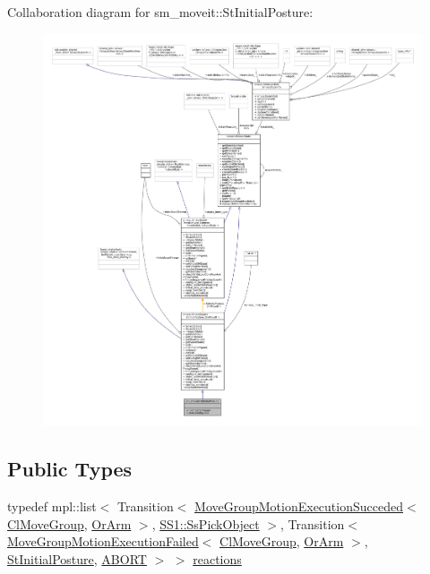 Collaboration diagram for sm\+\_\+moveit\+:\+:St\+Initial\+Posture\+:
\nopagebreak
\begin{figure}[H]
\begin{center}
\leavevmode
\includegraphics[width=350pt]{structsm__moveit_1_1StInitialPosture__coll__graph}
\end{center}
\end{figure}
\subsection*{Public Types}
\begin{DoxyCompactItemize}
\item 
typedef mpl\+::list$<$ Transition$<$ \hyperlink{structmoveit__z__client_1_1MoveGroupMotionExecutionSucceded}{Move\+Group\+Motion\+Execution\+Succeded}$<$ \hyperlink{classmoveit__z__client_1_1ClMoveGroup}{Cl\+Move\+Group}, \hyperlink{classsm__moveit_1_1OrArm}{Or\+Arm} $>$, \hyperlink{structsm__moveit_1_1SS1_1_1SsPickObject}{S\+S1\+::\+Ss\+Pick\+Object} $>$, Transition$<$ \hyperlink{structmoveit__z__client_1_1MoveGroupMotionExecutionFailed}{Move\+Group\+Motion\+Execution\+Failed}$<$ \hyperlink{classmoveit__z__client_1_1ClMoveGroup}{Cl\+Move\+Group}, \hyperlink{classsm__moveit_1_1OrArm}{Or\+Arm} $>$, \hyperlink{structsm__moveit_1_1StInitialPosture}{St\+Initial\+Posture}, \hyperlink{classABORT}{A\+B\+O\+RT} $>$ $>$ \hyperlink{structsm__moveit_1_1StInitialPosture_a0ca17de7a1f01a6c8e8904efb027f218}{reactions}
\end{DoxyCompactItemize}
